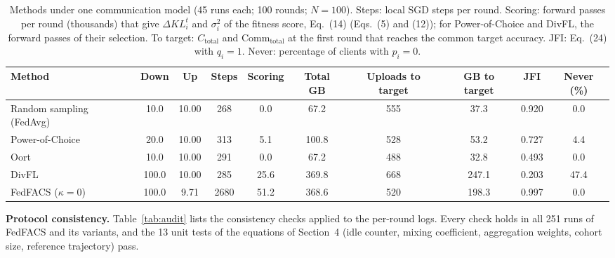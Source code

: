 \documentclass[pdflatex,sn-mathphys-num,oneside]{sn-jnl}%
\theoremstyle{thmstyleone}%
\theoremstyle{thmstyletwo}%
\theoremstyle{thmstylethree}%
\newlength{\journalfloatwidth}
\begin{document}
\begin{table}[!htbp]
\centering
\footnotesize
\setlength{\tabcolsep}{2.5pt}
\renewcommand{\arraystretch}{1.08}
\caption{Methods under one communication model (45 runs each; 100 rounds; $N=100$). Steps: local SGD steps per round. Scoring: forward passes per round (thousands) that give $\Delta KL_i^t$ and $\sigma_i^2$ of the fitness score, Eq.~(14) (Eqs.~(5) and (12)); for Power-of-Choice and DivFL, the forward passes of their selection. To target: $C_{\mathrm{total}}$ and $\mathrm{Comm}_{\mathrm{total}}$ at the first round that reaches the common target accuracy. JFI: Eq.~(24) with $q_i=1$. Never: percentage of clients with $p_i=0$.}
\label{tab:cost}
\begin{tabular*}{\journalfloatwidth}{@{\extracolsep{\fill}}lccccccccc@{}}
\toprule
Method & Down & Up & Steps & Scoring & Total GB & Uploads to target & GB to target & JFI & Never (\%) \\
\midrule
Random sampling (FedAvg) & 10.0 & 10.00 & 268 & 0.0 & 67.2 & 555 & 37.3 & 0.920 & 0.0 \\
Power-of-Choice & 20.0 & 10.00 & 313 & 5.1 & 100.8 & 528 & 53.2 & 0.727 & 4.4 \\
Oort & 10.0 & 10.00 & 291 & 0.0 & 67.2 & 488 & 32.8 & 0.493 & 0.0 \\
DivFL & 100.0 & 10.00 & 285 & 25.6 & 369.8 & 668 & 247.1 & 0.203 & 47.4 \\
FedFACS ($\kappa=0$) & 100.0 & 9.71 & 2680 & 51.2 & 368.6 & 520 & 198.3 & 0.997 & 0.0 \\
\bottomrule
\end{tabular*}
\end{table}

\textbf{Protocol consistency.} Table~\ref{tab:audit} lists the consistency checks applied to the per-round logs. Every check holds in all 251 runs of FedFACS and its variants, and the 13 unit tests of the equations of Section~4 (idle counter, mixing coefficient, aggregation weights, cohort size, reference trajectory) pass.
\end{document}
